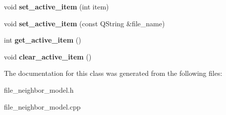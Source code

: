 \begin{DoxyCompactItemize}
\item 
\hypertarget{class_log__viewer_1_1_file__neighbor__model_a8b72248cb145f956a107fc0b18e7b151}{void {\bfseries set\-\_\-active\-\_\-item} (int item)}\label{class_log__viewer_1_1_file__neighbor__model_a8b72248cb145f956a107fc0b18e7b151}

\item 
\hypertarget{class_log__viewer_1_1_file__neighbor__model_a4b53d2224e0b499c8751a4444b3a3bf5}{void {\bfseries set\-\_\-active\-\_\-item} (const Q\-String \&file\-\_\-name)}\label{class_log__viewer_1_1_file__neighbor__model_a4b53d2224e0b499c8751a4444b3a3bf5}

\item 
\hypertarget{class_log__viewer_1_1_file__neighbor__model_a28f8faa31549ddce1f4302dc376ce312}{int {\bfseries get\-\_\-active\-\_\-item} ()}\label{class_log__viewer_1_1_file__neighbor__model_a28f8faa31549ddce1f4302dc376ce312}

\item 
\hypertarget{class_log__viewer_1_1_file__neighbor__model_a2e4c15a713b4f29df7883725c75701a2}{void {\bfseries clear\-\_\-active\-\_\-item} ()}\label{class_log__viewer_1_1_file__neighbor__model_a2e4c15a713b4f29df7883725c75701a2}

\end{DoxyCompactItemize}


The documentation for this class was generated from the following files\-:\begin{DoxyCompactItemize}
\item 
file\-\_\-neighbor\-\_\-model.\-h\item 
file\-\_\-neighbor\-\_\-model.\-cpp\end{DoxyCompactItemize}
